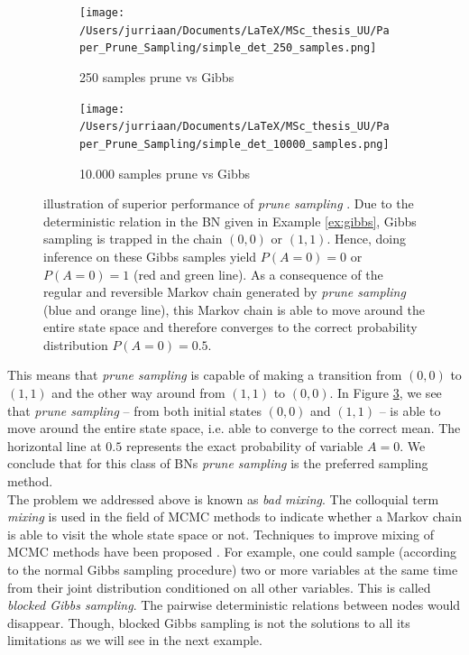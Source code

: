 \documentclass[a4paper, twoside, 11pt]{report}
\theoremstyle{plain}
\theoremstyle{definition}
\theoremstyle{remark}
\newcommand{\ps}{\textit{prune sampling }}
\begin{document}
\begin{figure}[t]
\centering
\begin{subfigure}{.49\textwidth}
  \centering
  \texttt{[image: /Users/jurriaan/Documents/LaTeX/MSc\_thesis\_UU/Paper\_Prune\_Sampling/simple\_det\_250\_samples.png]}
  \caption{250 samples prune vs Gibbs}
  \label{fig:sub1}
\end{subfigure}
\begin{subfigure}{.49\textwidth}
  \centering
  \texttt{[image: /Users/jurriaan/Documents/LaTeX/MSc\_thesis\_UU/Paper\_Prune\_Sampling/simple\_det\_10000\_samples.png]}
  \caption{10.000 samples prune vs Gibbs}
  \label{fig:sub2}
\end{subfigure}
\caption{illustration of superior performance of \ps. Due to the deterministic relation in the BN given in Example \ref{ex:gibbs}, Gibbs sampling is trapped in the chain $(0,0)$ or $(1,1)$. Hence, doing inference on these Gibbs samples yield $P(A = 0)=0$ or $P(A = 0)=1$ (red and green line). As a consequence of the regular and reversible Markov chain generated by \ps (blue and orange line), this Markov chain is able to move around the entire state space and therefore converges to the correct probability distribution $P(A = 0) = 0.5$.}
\label{simple-deterministic}
\end{figure}
This means that \ps is capable of making a transition from $(0,0)$ to $(1,1)$ and the other way around from $(1,1)$ to $(0,0)$. In Figure \ref{simple-deterministic}, we see that \ps -- from both initial states $(0,0)$ and $(1,1)$ -- is able to move around the entire state space, i.e. able to converge to the correct mean. The horizontal line at $0.5$ represents the exact probability of variable $A=0$. We conclude that for this class of BNs \ps is the preferred sampling method.\\

The problem we addressed above is known as \textit{bad mixing}. The colloquial term \textit{mixing} is used in the field of MCMC methods to indicate whether a Markov chain is able to visit the whole state space or not. Techniques to improve mixing of MCMC methods have been proposed \cite{besag1993spatial, brooks2011handbook, gilks1996interdisciplinary}. For example, one could sample (according to the normal Gibbs sampling procedure) two or more variables at the same time from their joint distribution conditioned on all other variables. This is called \textit{blocked Gibbs sampling}. The pairwise deterministic relations between nodes would disappear. Though, {blocked Gibbs sampling} is not the solutions to all its limitations as we will see in the next example.
\end{document}

